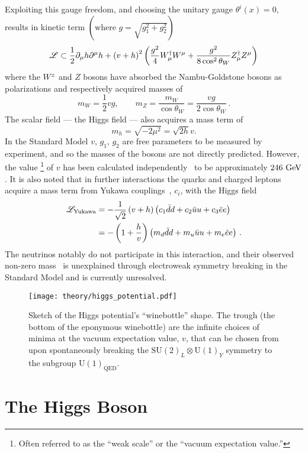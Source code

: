 Exploiting this gauge freedom, and choosing the unitary gauge $\theta^{i}(x)=0$, results in kinetic term $\left(\textrm{where } g = \sqrt{g_{1}^{2} + g_{2}^{2}}\right)$
\[
 \mathscr{L} \subset \frac{1}{2}\partial_{\mu} h \partial^{\mu} h + \left(v + h\right)^{2} \left(\frac{g^{2}}{4} W_{\mu}^{\dagger}W^{\mu} + \frac{g^{2}}{8 \cos^2 \theta_{W}} Z_{\mu}^{\dagger}Z^{\mu}\right)
\]
where the $W^{\pm}$ and $Z$ bosons have absorbed the Nambu-Goldstone bosons as polarizations and respectively acquired masses of
\[
 m_{W} = \frac{1}{2}vg, \qquad m_{Z} = \frac{m_{W}}{\cos\theta_{W}} = \frac{vg}{2\cos\theta_{W}}\,.
\]
The scalar field --- the Higgs field --- also acquires a mass term of
\[
 m_{h} = \sqrt{-2\mu^{2}} = \sqrt{2h}v.
\]
In the Standard Model $v$, $g_{1}$, $g_{2}$ are free parameters to be measured by experiment, and so the masses of the bosons are not directly predicted.
However, the value%
\footnote{Often referred to as the ``weak scale'' or the ``vacuum expectation value.''}
of $v$ has been calculated independently~\cite{Plehn:2005nk} to be approximately $246~\mathrm{GeV}$.
It is also noted that in further interactions the quarks and charged leptons acquire a mass term from Yukawa couplings~\cite{Yukawa:1935xg}, $c_i$, with the Higgs field
\[
 \begin{split}
  \mathscr{L}_{\textrm{Yukawa}} &= -\frac{1}{\sqrt{2}} \left(v+h\right) \left(c_{1}\bar{d}d + c_{2}\bar{u}u + c_{3}\bar{e}e\right) \\
  &= - \left(1 + \frac{h}{v}\right)\left(m_{d}\bar{d}d + m_{u}\bar{u}u + m_{e}\bar{e}e\right)\,.
 \end{split}
\]
The neutrinos notably do not participate in this interaction, and their observed non-zero mass~\cite{Ahmad:2001an} is unexplained through electroweak symmetry breaking in the Standard Model and is currently unresolved.

\begin{figure}[htbp]
 \centering
 \texttt{[image: theory/higgs\_potential.pdf]}
 \caption[Sketch of the Higgs potential shape.]{%
 Sketch of the Higgs potential's ``winebottle'' shape.
 The trough (the bottom of the eponymous winebottle) are the infinite choices of minima at the vacuum expectation value, $v$, that can be chosen from upon spontaneously breaking the $\mathrm{SU}(2)_{L} \otimes \mathrm{U}(1)_{Y}$ symmetry to the subgroup $\mathrm{U}(1)_{\textrm{QED}}$.}
 \label{fig:Higgs_potential}
\end{figure}

\section{The Higgs Boson}\label{section:Higgs_boson}

